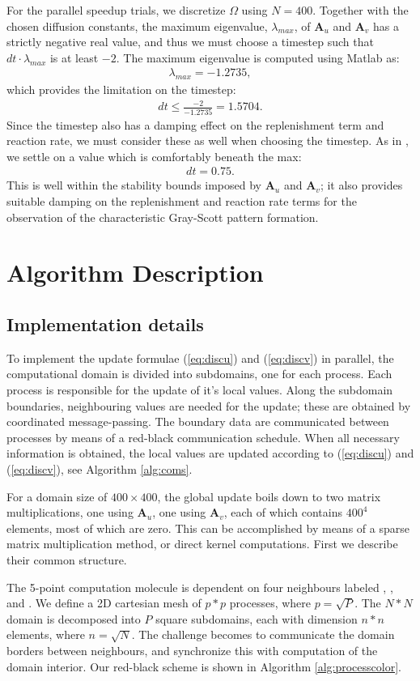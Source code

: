 \documentclass[a4paper,11pt]{article}
\newcommand{\ba}[1]{\begin{align*}    #1    \end{align*}}
\renewcommand{\vec}[1]{\mathbf{#1}}
\begin{document}
For the parallel speedup trials, we discretize $\Omega$ using $N = 400$.  Together with the chosen diffusion constants, the  maximum eigenvalue, $\lambda_{max}$, of $\vec{A}_u$ and $\vec{A}_v$ has a strictly negative real value, and thus we must choose a timestep such that $dt \cdot \lambda_{max}$ is at least $-2$.  The maximum eigenvalue is computed using Matlab as:
\ba{
\lambda_{max} = -1.2735,
}
which provides the limitation on the timestep:
\ba{
dt \le \frac{-2}{-1.2735} = 1.5704.
}
Since the timestep also has a damping effect on the replenishment term and reaction rate, we must consider these as well when choosing the timestep.  As in \cite{Wang}, we settle on a value which is comfortably beneath the max:
\ba{
dt = 0.75.
}
This is well within the stability bounds imposed by $\vec{A}_u$ and $\vec{A}_v$; it also provides suitable damping on the replenishment and reaction rate terms for the observation of the characteristic Gray-Scott pattern formation.

\section*{Algorithm Description}
\subsection*{Implementation details}
To implement the update formulae (\ref{eq:discu}) and (\ref{eq:discv}) in parallel, the computational domain is divided into subdomains, one for each process.  Each process is responsible for the update of it's local values.  Along the subdomain boundaries, neighbouring values are needed for the update; these are obtained by coordinated message-passing.  The boundary data are communicated between processes by means of a red-black communication schedule.  When all necessary information is obtained, the local values are updated according to (\ref{eq:discu}) and (\ref{eq:discv}), see Algorithm \ref{alg:coms}.

For a domain size of $400 \times 400$, the global update boils down to two matrix multiplications, one using $\vec{A}_u$, one using $\vec{A}_v$, each of which contains $400^4$ elements, most of which are zero.  This can be accomplished by means of a sparse matrix multiplication method, or direct kernel computations. First we describe their common structure.

The 5-point computation molecule is dependent on four neighbours labeled , ,  and . We define a 2D cartesian mesh of $p*p$ processes, where $p = \sqrt{P}$. The $N*N$ domain is decomposed into $P$ square subdomains, each with dimension $n*n$ elements, where $n = \sqrt{N}$. The challenge becomes to communicate the domain borders between neighbours, and synchronize this with computation of the domain interior. Our red-black scheme is shown in Algorithm \ref{alg:processcolor}.
\end{document}
